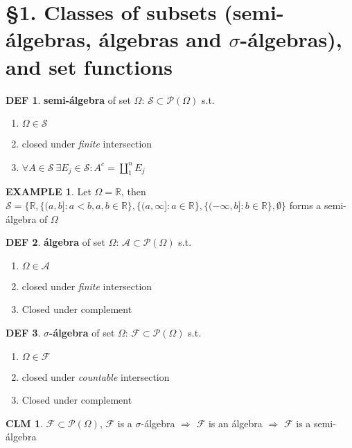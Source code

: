 \documentclass[hidelinks]{article}
\theoremstyle{definition}
\newtheorem*{defin}{DEF}
\newtheorem*{eg}{EXAMPLE}
\theoremstyle{dotless}
\newtheorem{claim}{CLM}[section]
\theoremstyle{remark}
\begin{document}
\section*{\S1. Classes of subsets (semi-álgebras, álgebras and $\sigma$-álgebras), and set functions}
\setcounter{section}{1}

\begin{defin}
\textbf{semi-álgebra} of set $\Omega$: $\mathscr{S}\subset\mathscr{P}(\Omega)$ s.t.
\begin{enumerate}[label=\arabic*\degree]
    \item $\Omega\in\mathscr{S}$
    \item closed under \emph{finite} intersection
    \item $\forall A\in\mathscr{S}\ \exists E_j\in\mathscr{S}:A^c=\coprod\limits_1^nE_j$
\end{enumerate}
\end{defin}

\begin{eg}
Let $\Omega=\mathbb{R}$, then $\mathscr{S}=\{\mathbb{R},\{(a,b]:a<b,a,b\in \mathbb{R}\},\{(a,\infty]:a\in \mathbb{R}\},\{(-\infty,b]:b\in\mathbb{R}\},\emptyset\}$ forms a semi-álgebra of $\Omega$
\end{eg}

\begin{defin}
\textbf{álgebra} of set $\Omega$:
$\mathscr{A}\subset\mathscr{P}(\Omega)$ s.t.
\begin{enumerate}[label=\arabic*\degree]
    \item $\Omega\in\mathscr{A}$
    \item closed under \emph{finite} intersection
    \item Closed under complement
\end{enumerate}
\end{defin}

\begin{defin}
\textbf{$\sigma$-álgebra} of set $\Omega$:
$\mathscr{F}\subset\mathscr{P}(\Omega)$ s.t.
\begin{enumerate}[label=\arabic*\degree]
    \item $\Omega\in\mathscr{F}$
    \item closed under \emph{countable} intersection
    \item Closed under complement
\end{enumerate}
\end{defin}

\begin{claim}
$\mathscr{F}\subset\mathscr{P}(\Omega)$, $\mathscr{F}$ is a $\sigma$-álgebra $\Rightarrow$ $\mathscr{F}$ is an álgebra $\Rightarrow$ $\mathscr{F}$ is a semi-álgebra
\end{claim}
\end{document}
